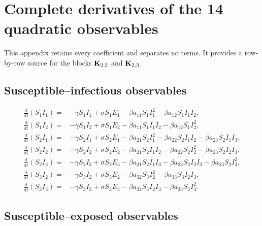 \section{Complete derivatives of the 14 quadratic observables}
\label{app:full_derivatives}

This appendix retains every coefficient and separates no terms. It provides a
row-by-row source for the blocks $\mathbf{K}_{2,2}$ and $\mathbf{K}_{2,3}$.

\subsection{Susceptible--infectious observables}

\begin{align*}
\frac{d}{dt}(S_1I_1)
={}&-\gamma S_1I_1+\sigma S_1E_1
-\beta a_{11}S_1I_1^2
-\beta a_{12}S_1I_1I_2,\\
\frac{d}{dt}(S_1I_2)
={}&-\gamma S_1I_2+\sigma S_1E_2
-\beta a_{11}S_1I_1I_2
-\beta a_{12}S_1I_2^2,\\
\frac{d}{dt}(S_2I_1)
={}&-\gamma S_2I_1+\sigma S_2E_1
-\beta a_{21}S_2I_1^2
-\beta a_{22}S_2I_1I_2
-\beta a_{23}S_2I_1I_3,\\
\frac{d}{dt}(S_2I_2)
={}&-\gamma S_2I_2+\sigma S_2E_2
-\beta a_{21}S_2I_1I_2
-\beta a_{22}S_2I_2^2
-\beta a_{23}S_2I_2I_3,\\
\frac{d}{dt}(S_2I_3)
={}&-\gamma S_2I_3+\sigma S_2E_3
-\beta a_{21}S_2I_1I_3
-\beta a_{22}S_2I_2I_3
-\beta a_{23}S_2I_3^2,\\
\frac{d}{dt}(S_3I_2)
={}&-\gamma S_3I_2+\sigma S_3E_2
-\beta a_{32}S_3I_2^2
-\beta a_{33}S_3I_2I_3,\\
\frac{d}{dt}(S_3I_3)
={}&-\gamma S_3I_3+\sigma S_3E_3
-\beta a_{32}S_3I_2I_3
-\beta a_{33}S_3I_3^2.
\end{align*}

\subsection{Susceptible--exposed observables}

